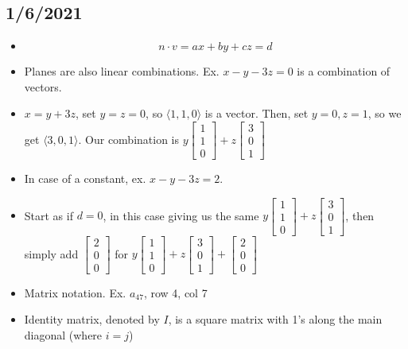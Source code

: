 \subsection{1/6/2021}
\begin{itemize}
    \item $$n\cdot v=ax+by+cz=d$$
    \item Planes are also linear combinations. Ex. $x-y-3z=0$ is a combination of vectors.
    \item $x=y+3z$, set $y=z=0$, so $\langle 1, 1, 0\rangle$ is a vector. Then, set $y=0, z=1$, so we get $\langle 3, 0 ,1 \rangle$. Our combination is $y\begin{bmatrix}1\\1\\0\end{bmatrix}+z\begin{bmatrix}3\\0\\1\end{bmatrix}$
    \item In case of a constant, ex. $x-y-3z=2$.
    \item Start as if $d=0$, in this case giving us the same $y\begin{bmatrix}1\\1\\0\end{bmatrix}+z\begin{bmatrix}3\\0\\1\end{bmatrix}$, then simply add $\begin{bmatrix}2\\0\\0\end{bmatrix}$ for $y\begin{bmatrix}1\\1\\0\end{bmatrix}+z\begin{bmatrix}3\\0\\1\end{bmatrix}+\begin{bmatrix}2\\0\\0\end{bmatrix}$
    \item Matrix notation. Ex. $a_{4 7}$, row 4, col 7
    \item Identity matrix, denoted by $I$, is a square matrix with 1's along the main diagonal (where $i=j$)

\end{itemize}
